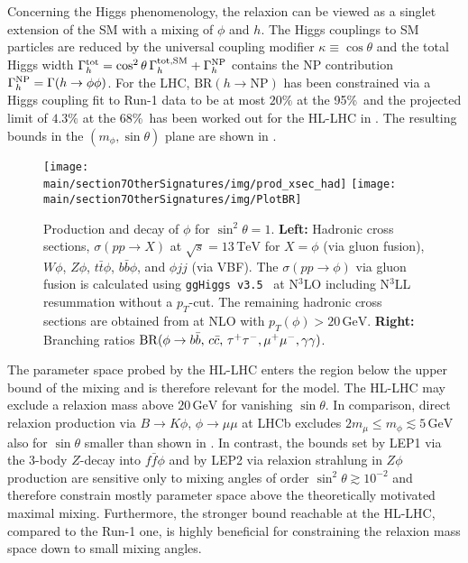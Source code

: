 Concerning the Higgs phenomenology, the relaxion can be viewed as a singlet extension of the SM with a mixing of $\phi$ and $h$. The Higgs couplings to SM particles are reduced by the universal coupling modifier $\kappa\equiv \cos\theta$ and the total Higgs width 
$\Gamma_h^{\rm tot} = \cos^2\theta\, \Gamma_h^{\rm tot,SM} + \Gamma_h^{\rm NP}$
contains the NP contribution $\Gamma_h^{\rm NP} = \Gamma(h\to\phi\phi)$.
For the LHC, $\textrm{BR}(h\to\textrm{NP})$ has been constrained via a Higgs coupling fit to Run-1 data to be at most $20\%$ at the 95\%~\cl and the projected limit of $4.3\%$ at the 68\%~\cl has been worked out for the HL-LHC in . The resulting bounds in the $(m_\phi, \sin\theta)$ plane are shown in .

\begin{figure}[t!]
 \begin{center}
  \texttt{[image: \\main/section7OtherSignatures/img/prod\_xsec\_had]}\hfill
  \texttt{[image: \\main/section7OtherSignatures/img/PlotBR]}
  \caption{Production and decay of $\phi$ for $\sin^2\theta=1$.
    \textbf{Left:} Hadronic cross sections, $\sigma(pp\to X)$ at $\sqrt{s}=13\,\textrm{TeV}$
    for $X=\phi$ (via gluon fusion), $W\phi$, $Z\phi$, $t\bar t\phi$, $b\bar b\phi$, and $\phi jj$
    (via VBF).  The $\sigma(pp\to\phi)$ via gluon fusion is calculated using \texttt{ggHiggs
      v3.5}~\cite{Ball:2013bra,Bonvini:2014jma,Bonvini:2016frm,Ahmed:2016otz} at N$^3$LO including
    N$^3$LL resummation without a $p_T$-cut.  The remaining hadronic cross sections are obtained
    from \MGvATNLO \cite{Alwall:2014hca} at NLO with $p_T(\phi)>20\,\textrm{GeV}$.
    \textbf{Right:} Branching ratios
    ${\rm BR}(\phi\to b\bar b,\, c\bar c,\, \tau^+\tau^-, \mu^+\mu^-, \gamma\gamma)$.
   }
   \label{fig:prod_decay}
 \end{center}
\end{figure}

The parameter space probed by the HL-LHC enters the region below the upper
 bound of the mixing and is therefore relevant for the model. The HL-LHC may exclude a
 relaxion mass above $20\,\textrm{GeV}$ for vanishing $\sin\theta$.
 In comparison, direct relaxion production via $B\to K\phi$,
 $\phi\to\mu\mu$ at LHCb excludes $2m_\mu \leq m_\phi \lesssim 5\,\textrm{GeV}$ also for $\sin\theta$ smaller
 than shown in . In contrast, the bounds set by LEP1 via
 the 3-body $Z$-decay into $f\bar f\phi$ and by LEP2 via relaxion strahlung in $Z\phi$ production
 are sensitive only to mixing angles of order  $\sin^2\theta \gtrsim 10^{-2}$ and therefore constrain mostly
 parameter space above the theoretically motivated maximal mixing.
Furthermore, the stronger bound reachable at the HL-LHC, compared to the Run-1 one, is highly beneficial for constraining the relaxion mass space down to small mixing angles.
 
